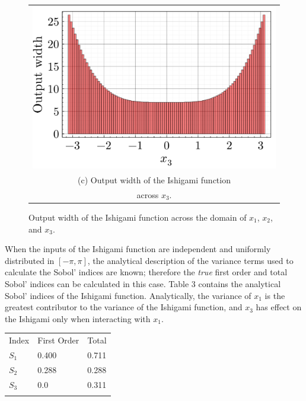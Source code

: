 \documentclass[twocolumn]{rps-esrel2022}
\begin{document}
\begin{figure}[!b]
	\begin{tabular}{@{}c@{}}
		\includegraphics[width=\linewidth]{applications/ishigami_pinching_3.pdf} \\[\abovecaptionskip]
		\small (c) Output width of the Ishigami function\\
		\small across $x_3$.
	  \end{tabular}

	\caption{Output width of the Ishigami function across the domain of $x_1$, $x_2$, and $x_3$.
	}
\end{figure}

When the inputs of the Ishigami function are independent and uniformly distributed in $[-\pi,\pi]$, the analytical description of the variance
terms used to calculate the Sobol' indices are known; therefore the \textit{true} first order and total Sobol' indices can be calculated in this case.
Table 3 contains the analytical Sobol' indices of the Ishigami function.
Analytically, the variance of $x_1$ is the greatest contributor to the variance of the Ishigami function, and $x_3$ has effect on the Ishigami
only when interacting with $x_1$.

\begin{table}[!h]
	{
	\begin{tabular}{@{}lll@{}}\toprule
	Index & First Order & Total\\
\colrule

	$S_1$ & 0.400 & 0.711\\
	$S_2$ & 0.288 & 0.288\\
	$S_3$ & 0.0 & 0.311\\
\botrule
	\end{tabular}}

\end{table}
\end{document}
